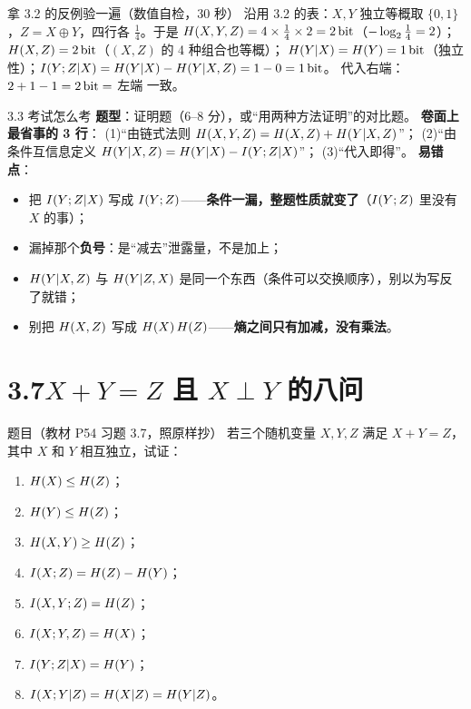 \documentclass[11pt,a4paper]{ctexart}
\begin{document}
\begin{calc}{拿 3.2 的反例验一遍（数值自检，30 秒）}
沿用 3.2 的表：$X,Y$ 独立等概取 $\{0,1\}$，$Z=X\oplus Y$，四行各 $\frac14$。于是
$H\!\left(X,Y,Z\right)=4\times\frac14\times2=2\,\text{bit}$（$-\log_{2}\frac14=2$）；$H\!\left(X,Z\right)=2\,\text{bit}$（$(X,Z)$ 的 4 种组合也等概）；
$H\!\left(Y|X\right)=H\!\left(Y\right)=1\,\text{bit}$（独立性）；$I\!\left(Y;Z|X\right)=H\!\left(Y|X\right)-H\!\left(Y|X,Z\right)=1-0=1\,\text{bit}$。
代入右端：$2+1-1=2\,\text{bit}=$ 左端 \checkmark 一致。
\end{calc}

\begin{exam}{3.3 考试怎么考}
\textbf{题型}：证明题（6--8 分），或“用两种方法证明”的对比题。
\textbf{卷面上最省事的 3 行}：
(1)“由链式法则 $H\!\left(X,Y,Z\right)=H\!\left(X,Z\right)+H\!\left(Y|X,Z\right)$”；
(2)“由条件互信息定义 $H\!\left(Y|X,Z\right)=H\!\left(Y|X\right)-I\!\left(Y;Z|X\right)$”；
(3)“代入即得”。
\textbf{易错点}：
\begin{itemize}[leftmargin=1.5em,itemsep=1pt,topsep=1pt]
  \item 把 $I\!\left(Y;Z|X\right)$ 写成 $I\!\left(Y;Z\right)$——\textbf{条件一漏，整题性质就变了}（$I\!\left(Y;Z\right)$ 里没有 $X$ 的事）；
  \item 漏掉那个\textbf{负号}：是“减去”泄露量，不是加上；
  \item $H\!\left(Y|X,Z\right)$ 与 $H\!\left(Y|Z,X\right)$ 是同一个东西（条件可以交换顺序），别以为写反了就错；
  \item 别把 $H\!\left(X,Z\right)$ 写成 $H\!\left(X\right)H\!\left(Z\right)$——\textbf{熵之间只有加减，没有乘法}。
\end{itemize}
\end{exam}

\section{3.7\quad $X+Y=Z$ 且 $X\perp Y$ 的八问}

\begin{defbox}{题目（教材 P54 习题 3.7，照原样抄）}
若三个随机变量 $X,Y,Z$ 满足 $X+Y=Z$，其中 $X$ 和 $Y$ 相互独立，试证：
\begin{enumerate}[label=(\arabic*),leftmargin=1.9em,itemsep=1pt,topsep=2pt]
  \item $H\!\left(X\right)\le H\!\left(Z\right)$；
  \item $H\!\left(Y\right)\le H\!\left(Z\right)$；
  \item $H\!\left(X,Y\right)\ge H\!\left(Z\right)$；
  \item $I\!\left(X;Z\right)=H\!\left(Z\right)-H\!\left(Y\right)$；
  \item $I\!\left(X,Y;Z\right)=H\!\left(Z\right)$；
  \item $I\!\left(X;Y,Z\right)=H\!\left(X\right)$；
  \item $I\!\left(Y;Z|X\right)=H\!\left(Y\right)$；
  \item $I\!\left(X;Y|Z\right)=H\!\left(X|Z\right)=H\!\left(Y|Z\right)$。
\end{enumerate}
\end{defbox}
\end{document}
